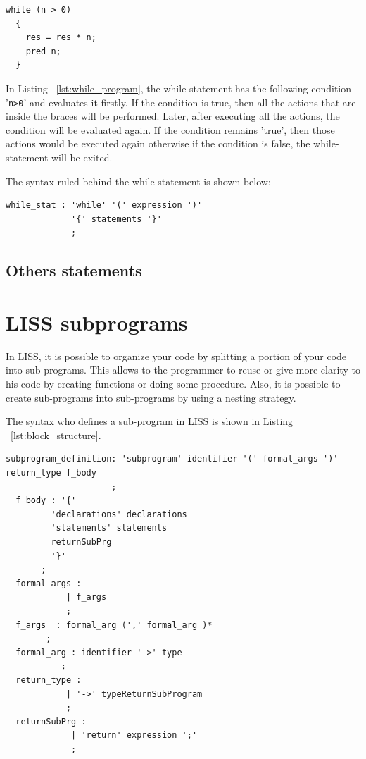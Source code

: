 \documentclass[
  oneside,
  11pt, a4paper,
  footinclude=true,
  headinclude=true,
  cleardoublepage=empty
]{scrbook}
\begin{document}
\begin{lstlisting}[caption={LISS syntax of a while-statement in LISS},label={lst:while_program}]
  while (n > 0)
  {
    res = res * n;
    pred n;
  }
\end{lstlisting}

In Listing ~\ref{lst:while_program}, the while-statement has the following condition '\verb+n>0+' and evaluates it firstly. If the condition is true, then all the actions that are inside the braces will be performed. Later, after executing all the actions, the condition will be evaluated again. If the condition remains 'true', then those actions would be executed again otherwise if the condition is false, the while-statement will be exited.

The syntax ruled behind the while-statement is shown below:

\begin{lstlisting}[caption={BNF of while-statement in LISS}]
  while_stat : 'while' '(' expression ')'
             '{' statements '}'
             ;
\end{lstlisting}



\subsection{Others statements}


\section{LISS subprograms}
\label{sec:subprograms}

In LISS, it is possible to organize your code by splitting a portion of your code into sub-programs. This allows to the programmer to reuse or give more clarity to his code by creating functions or doing some procedure.
Also, it is possible to create sub-programs into sub-programs by using a nesting strategy.

The syntax who defines a sub-program in LISS is shown in Listing ~\ref{lst:block_structure}.

\begin{lstlisting}[caption={BNF of block structure in LISS},label={lst:block_structure}]
  subprogram_definition: 'subprogram' identifier '(' formal_args ')' return_type f_body
                     ;
  f_body : '{'
         'declarations' declarations
         'statements' statements
         returnSubPrg
         '}'
       ;
  formal_args :
            | f_args
            ;
  f_args  : formal_arg (',' formal_arg )*
        ;
  formal_arg : identifier '->' type
           ;
  return_type :
            | '->' typeReturnSubProgram
            ;
  returnSubPrg :
             | 'return' expression ';'
             ;
\end{lstlisting}
\end{document}
